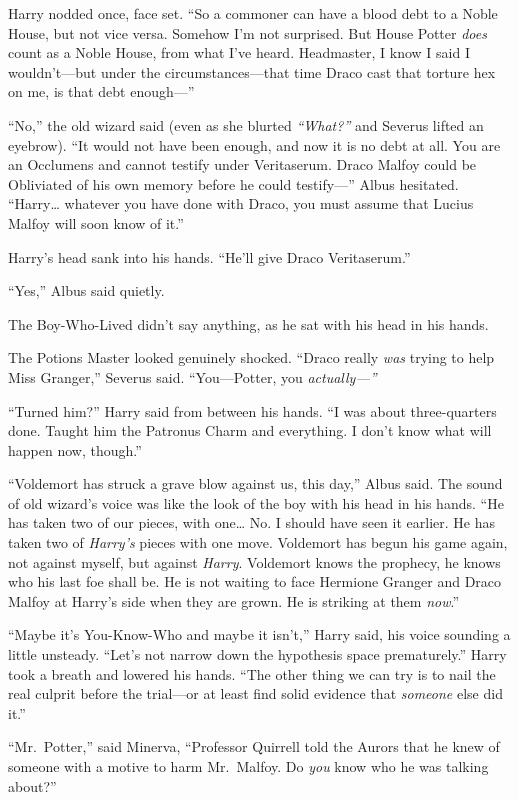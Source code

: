 Harry nodded once, face set. ``So a commoner can have a blood debt to a
Noble House, but not vice versa. Somehow I'm not surprised. But House
Potter \emph{does} count as a Noble House, from what I've heard.
Headmaster, I know I said I wouldn't---but under the
circumstances---that time Draco cast that torture hex on me, is that
debt enough---''

``No,'' the old wizard said (even as she blurted \emph{``What?''} and
Severus lifted an eyebrow). ``It would not have been enough, and now it
is no debt at all. You are an Occlumens and cannot testify under
Veritaserum. Draco Malfoy could be Obliviated of his own memory before
he could testify---'' Albus hesitated. ``Harry\ldots{} whatever you have
done with Draco, you must assume that Lucius Malfoy will soon know of
it.''

Harry's head sank into his hands. ``He'll give Draco Veritaserum.''

``Yes,'' Albus said quietly.

The Boy-Who-Lived didn't say anything, as he sat with his head in his
hands.

The Potions Master looked genuinely shocked. ``Draco really \emph{was}
trying to help Miss Granger,'' Severus said. ``You---Potter, you
\emph{actually---''}

``Turned him?'' Harry said from between his hands. ``I was about
three-quarters done. Taught him the Patronus Charm and everything. I
don't know what will happen now, though.''

``Voldemort has struck a grave blow against us, this day,'' Albus said.
The sound of old wizard's voice was like the look of the boy with his
head in his hands. ``He has taken two of our pieces, with one\ldots{}
No. I should have seen it earlier. He has taken two of \emph{Harry's}
pieces with one move. Voldemort has begun his game again, not against
myself, but against \emph{Harry}. Voldemort knows the prophecy, he knows
who his last foe shall be. He is not waiting to face Hermione Granger
and Draco Malfoy at Harry's side when they are grown. He is striking at
them \emph{now}.''

``Maybe it's You-Know-Who and maybe it isn't,'' Harry said, his voice
sounding a little unsteady. ``Let's not narrow down the hypothesis space
prematurely.'' Harry took a breath and lowered his hands. ``The other
thing we can try is to nail the real culprit before the trial---or at
least find solid evidence that \emph{someone} else did it.''

``Mr.~Potter,'' said Minerva, ``Professor Quirrell told the Aurors that
he knew of someone with a motive to harm Mr.~Malfoy. Do \emph{you} know
who he was talking about?''

